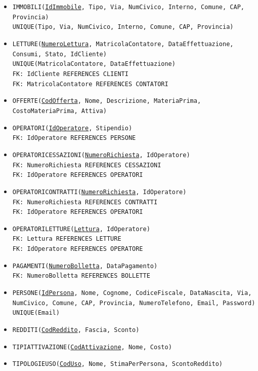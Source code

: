 \documentclass[a4paper,12pt]{report}
\begin{document}
\begin{itemize}
    \item \texttt{IMMOBILI(\underline{IdImmobile}, Tipo, Via, NumCivico, Interno, Comune, CAP, Provincia) \\
    UNIQUE(Tipo, Via, NumCivico, Interno, Comune, CAP, Provincia)}
    
    \item \texttt{LETTURE(\underline{NumeroLettura}, MatricolaContatore, DataEffettuazione, Consumi, Stato, IdCliente) \\
    UNIQUE(MatricolaContatore, DataEffettuazione) \\
    FK: IdCliente REFERENCES CLIENTI \\
    FK: MatricolaContatore REFERENCES CONTATORI}
    
    \item \texttt{OFFERTE(\underline{CodOfferta}, Nome, Descrizione, MateriaPrima, CostoMateriaPrima, Attiva)}
    
    \item \texttt{OPERATORI(\underline{IdOperatore}, Stipendio) \\
    FK: IdOperatore REFERENCES PERSONE}
    
    \item \texttt{OPERATORI\textunderscore CESSAZIONI(\underline{NumeroRichiesta}, IdOperatore) \\
    FK: NumeroRichiesta REFERENCES CESSAZIONI \\
    FK: IdOperatore REFERENCES OPERATORI}
    
    \item \texttt{OPERATORI\textunderscore CONTRATTI(\underline{NumeroRichiesta}, IdOperatore) \\
    FK: NumeroRichiesta REFERENCES CONTRATTI \\
    FK: IdOperatore REFERENCES OPERATORI}
    
    \item \texttt{OPERATORI\textunderscore LETTURE(\underline{Lettura}, IdOperatore) \\
    FK: Lettura REFERENCES LETTURE \\
    FK: IdOperatore REFERENCES OPERATORE}
    
    \item \texttt{PAGAMENTI(\underline{NumeroBolletta}, DataPagamento) \\
    FK: NumeroBolletta REFERENCES BOLLETTE}
    
    \item \texttt{PERSONE(\underline{IdPersona}, Nome, Cognome, CodiceFiscale, DataNascita, Via, NumCivico, Comune, CAP, Provincia, NumeroTelefono, Email, Password) \\
    UNIQUE(Email)}
    
    \item \texttt{REDDITI(\underline{CodReddito}, Fascia, Sconto)}
    
    \item \texttt{TIPI\textunderscore ATTIVAZIONE(\underline{CodAttivazione}, Nome, Costo)}
    
    \item \texttt{TIPOLOGIE\textunderscore USO(\underline{CodUso}, Nome, StimaPerPersona, ScontoReddito)}
\end{itemize}
\end{document}
